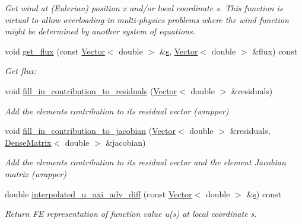 \begin{DoxyCompactItemize}
\begin{DoxyCompactList}\small\item\em Get wind at (Eulerian) position x and/or local coordinate s. This function is virtual to allow overloading in multi-\/physics problems where the wind function might be determined by another system of equations. \end{DoxyCompactList}\item 
void \hyperlink{classoomph_1_1AxisymAdvectionDiffusionEquations_a47f44dc0f9ba78e0db3a72c9b1f90633}{get\+\_\+flux} (const \hyperlink{classoomph_1_1Vector}{Vector}$<$ double $>$ \&\hyperlink{cfortran_8h_ab7123126e4885ef647dd9c6e3807a21c}{s}, \hyperlink{classoomph_1_1Vector}{Vector}$<$ double $>$ \&flux) const
\begin{DoxyCompactList}\small\item\em Get flux\+: \end{DoxyCompactList}\item 
void \hyperlink{classoomph_1_1AxisymAdvectionDiffusionEquations_a00d9356ebf0f2fe1a5f470db379c9bd9}{fill\+\_\+in\+\_\+contribution\+\_\+to\+\_\+residuals} (\hyperlink{classoomph_1_1Vector}{Vector}$<$ double $>$ \&residuals)
\begin{DoxyCompactList}\small\item\em Add the element\textquotesingle{}s contribution to its residual vector (wrapper) \end{DoxyCompactList}\item 
void \hyperlink{classoomph_1_1AxisymAdvectionDiffusionEquations_a4afbd032aca7d93c1e4402bd3ccc2379}{fill\+\_\+in\+\_\+contribution\+\_\+to\+\_\+jacobian} (\hyperlink{classoomph_1_1Vector}{Vector}$<$ double $>$ \&residuals, \hyperlink{classoomph_1_1DenseMatrix}{Dense\+Matrix}$<$ double $>$ \&jacobian)
\begin{DoxyCompactList}\small\item\em Add the element\textquotesingle{}s contribution to its residual vector and the element Jacobian matrix (wrapper) \end{DoxyCompactList}\item 
double \hyperlink{classoomph_1_1AxisymAdvectionDiffusionEquations_a91e4ff18062a265f7ed265902914e15a}{interpolated\+\_\+u\+\_\+axi\+\_\+adv\+\_\+diff} (const \hyperlink{classoomph_1_1Vector}{Vector}$<$ double $>$ \&\hyperlink{cfortran_8h_ab7123126e4885ef647dd9c6e3807a21c}{s}) const
\begin{DoxyCompactList}\small\item\em Return FE representation of function value u(s) at local coordinate s. \end{DoxyCompactList}\item 

\end{DoxyCompactItemize}
